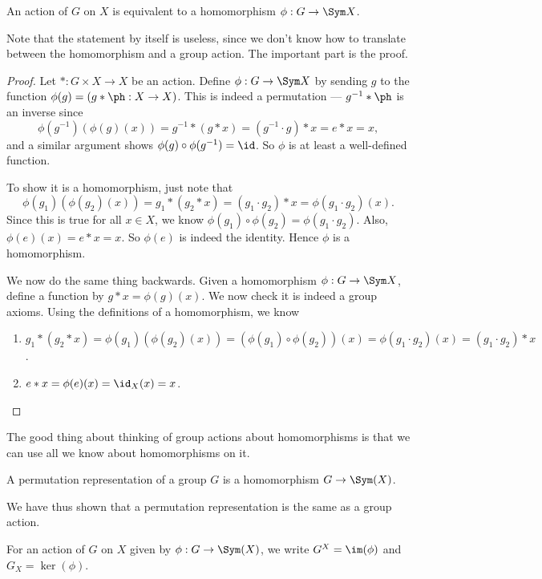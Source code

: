 \documentclass[a4paper]{article}
\begin{document}
\begin{lemma}
  An action of $G$ on $X$ is equivalent to a homomorphism $\phi: G \to \Sym X$.
\end{lemma}
Note that the statement by itself is useless, since we don't know how to translate between the homomorphism and a group action. The important part is the proof.
\begin{proof}
  Let $*: G \times X \to X$ be an action. Define $\phi: G \to \Sym X$ by sending $g$ to the function $\phi(g) = (g * \ph : X \to X)$. This is indeed a permutation --- $g^{-1} * \ph$ is an inverse since
  \[
    \phi(g^{-1})(\phi(g)(x)) = g^{-1} * (g * x) = (g^{-1} \cdot g) * x = e * x = x,
  \]
  and a similar argument shows $\phi(g) \circ \phi(g^{-1}) = \id$. So $\phi$ is at least a well-defined function.

  To show it is a homomorphism, just note that
  \[
    \phi(g_1)(\phi(g_2)(x)) = g_1 * (g_2 * x) = (g_1 \cdot g_2) * x = \phi(g_1 \cdot g_2)(x).
  \]
  Since this is true for all $x \in X$, we know $\phi(g_1)\circ \phi(g_2) = \phi(g_1 \cdot g_2)$. Also, $\phi(e)(x) = e * x = x$. So $\phi(e)$ is indeed the identity. Hence $\phi$ is a homomorphism.

  We now do the same thing backwards. Given a homomorphism $\phi: G \to \Sym X$, define a function by $g * x = \phi(g)(x)$. We now check it is indeed a group axioms. Using the definitions of a homomorphism, we know
  \begin{enumerate}
    \item $g_1 * (g_2 * x) = \phi(g_1)(\phi(g_2)(x)) = (\phi(g_1) \circ \phi(g_2))(x) = \phi(g_1 \cdot g_2)(x) = (g_1 \cdot g_2) * x$.
    \item $e * x = \phi(e)(x) = \id_X(x) = x$.
  \end{enumerate}
\end{proof}
The good thing about thinking of group actions about homomorphisms is that we can use all we know about homomorphisms on it.

\begin{defi}
  A permutation representation of a group $G$ is a homomorphism $G \to \Sym (X)$.
\end{defi}
We have thus shown that a permutation representation is the same as a group action.

\begin{notation}
  For an action of $G$ on $X$ given by $\phi: G \to \Sym(X)$, we write $G^X = \im(\phi)$ and $G_X = \ker(\phi)$.
\end{notation}
\end{document}
